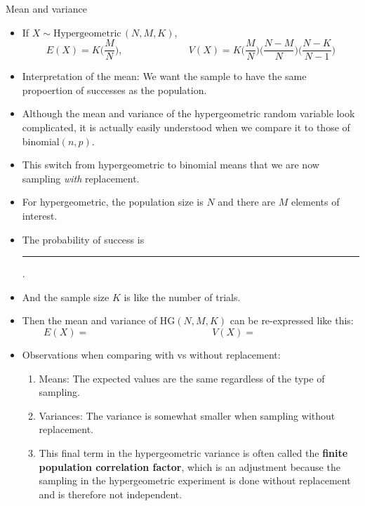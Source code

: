 \documentclass{article}
\newcommand{\blankul}[1]{\rule[-1.5mm]{#1}{0.15mm}}	%
\newcommand{\follow}[1]{\sim \text{#1}\,}		%
\begin{document}
Mean and variance\bigskip
\begin{itemize}
    \item If $X \follow{Hypergeometric}(N, M, K)$,
    \[E(X) = K \bigg(\frac{M}{N}\bigg), \hspace{80pt} V(X) = K \bigg(\frac{M}{N}\bigg) \bigg(\frac{N - M}{N}\bigg) \bigg(\frac{N - K}{N - 1}\bigg)\]
    \item[] Interpretation of the mean: We want the sample to have the same propoertion of successes as the population.
    \item Although the mean and variance of the hypergeometric random variable look complicated, it is actually easily understood when we compare it to those of binomial$(n, p)$.\vspace{30pt}
    \item[] This switch from hypergeometric to binomial means that we are now sampling \textit{with} replacement.
    \item For hypergeometric, the population size is $N$ and there are $M$ elements of interest.
    \item[] The probability of success is \blankul{2cm}.
    \item[] And the sample size $K$ is like the number of trials\hspace{10pt}.
    \item[] Then the mean and variance of HG$(N, M, K)$ can be re-expressed like this:\bigskip
    \[E(X) = \hspace{150pt} V(X) = \hspace{100pt}\]\vspace{30pt}
    \item Observations when comparing with vs without replacement:
    \begin{enumerate}
        \item Means: The expected values are the same regardless of the type of sampling.
        \item Variances: The variance is somewhat smaller when sampling without replacement.
        \item[] This final term in the hypergeometric variance is often called the \textbf{finite population correlation factor}, which is an adjustment because the sampling in the hypergeometric experiment is done without replacement and is therefore not independent.
    \end{enumerate}
\end{itemize}

\newpage
\end{document}
